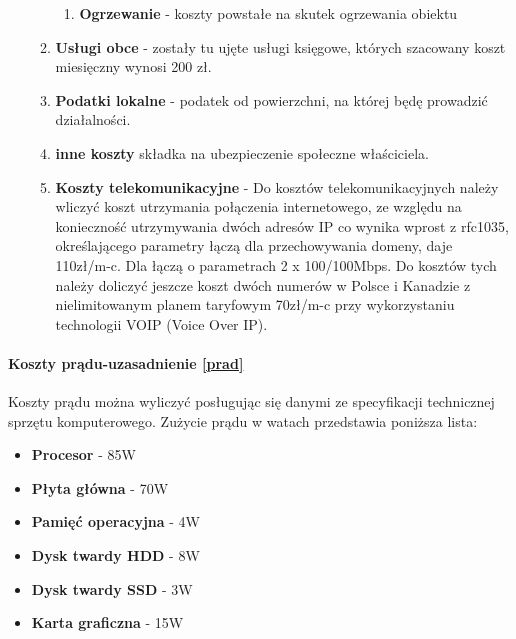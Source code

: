 \begin{enumerate}
\begin{enumerate}
\begin{enumerate}
						\item{\textbf{Ogrzewanie}} - koszty powstałe na skutek ogrzewania obiektu 
						
					\end{enumerate}
					
				\item{\textbf{Usługi obce}} - zostały tu ujęte usługi księgowe, których szacowany koszt miesięczny wynosi 200 zł.
			
				\item{\textbf{Podatki lokalne}} - podatek od powierzchni, na której będę prowadzić działalności.

				\item{\textbf{inne koszty}} składka na ubezpieczenie  społeczne  właściciela.
			
				\item{\textbf{Koszty telekomunikacyjne}} - Do kosztów telekomunikacyjnych należy wliczyć koszt utrzymania połączenia internetowego, ze względu na konieczność utrzymywania dwóch adresów IP co wynika wprost z rfc1035, określającego parametry łączą dla przechowywania domeny, daje 110zł/m-c. Dla łączą o parametrach 2 x 100/100Mbps. Do kosztów tych należy doliczyć jeszcze koszt dwóch numerów w Polsce i Kanadzie z nielimitowanym planem taryfowym 70zł/m-c przy wykorzystaniu technologii VOIP (Voice Over IP).
		
			\end{enumerate}
				
	\end{enumerate}		

			
		\paragraph{Koszty prądu-uzasadnienie \cref{prad}}		
			
			
	\par Koszty prądu można wyliczyć posługując się danymi ze specyfikacji technicznej sprzętu komputerowego. Zużycie prądu w watach przedstawia poniższa lista:
	
			\begin{itemize}
				\item{\textbf{Procesor}} - 85W
					
				\item{\textbf{Płyta główna}} - 70W
					
				\item{\textbf{Pamięć operacyjna}} - 4W
					
				\item{\textbf{Dysk twardy HDD}} - 8W
					
				\item{\textbf{Dysk twardy SSD}} - 3W
					
				\item{\textbf{Karta graficzna}} - 15W
			\end{itemize}

